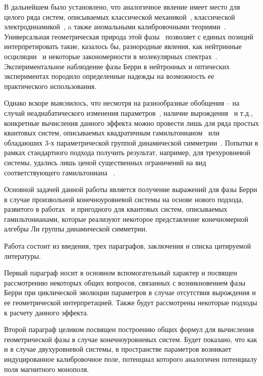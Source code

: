 \documentclass[a4paper,titlepage]{article}
\begin{document}
В дальнейшем было установлено, что аналогичное явление имеет место
для целого ряда систем, описываемых классической механикой~\cite{60},
классической электродинамикой~\cite{61}, a также аномальными калибровочными
теориями~\cite{62,63,64}. Универсальная геометрическая природа этой
фазы~\cite{SimonWork} позволяет с единых позиций интерпретировать такие, казалось бы,
разнородные явления, как нейтринные осциляции~\cite{NaumovWork} и некоторые
закономерности в молекулярных спектрах~\cite{AboutPhaseInSpectra}.
Экспериментальное наблюдение фазы Берри в нейтронных и оптических
экспериментах породило определенные надежды на возможность ее практического
использования.

Однако вскоре выяснилось, что несмотря на разнообразные обобщения -- на
случай неадиабатического изменения параметров~\cite{91}, наличие
вырождения~\cite{WilzekZeeWork} и т.д., конкретные вычисления данного эффекта
можно
провести лишь для ряда простых квантовых систем, описываемых квадратичным
гамильтонианом~\cite{About2Hamiltonian} или обладаюших 3-х параметрической
группой динамической симметрии~\cite{FirstBerryWork,AboutExactSolution}.
Попытки в рамках стандартного подхода
получить результат, например, для трехуровневой системы, удались лишь
ценой существенных ограничений на вид соответствующего
гамильтониана ~\cite{CeulemansWork,KorenblitWork}.

Основной задачей данной работы является получение выражений для
фазы Берри в случае произвольной конечноуровневой системы на основе нового
подхода, развитого в работах~\cite{TolkachevTregubovich1,TolkachevTregubovich2}
и пригодного для квантовых систем, описываемых гамильтонианами,
которые реализуют некоторое представление конечномерной алгебры Ли группы
динамической симметрии.

Работа состоит из введения, трех параграфов, заключения и списка цитируемой
литературы.

Первый параграф носит в основном вспомогательный характер и посвящен
рассмотрению некоторых общих вопросов, связанных с возникновением
фазы Берри при циклической эволюции параметров в случае отсутствия вырождения
и ее геометрической интерпретацией. Также будут рассмотрены некоторые подходы
к расчету данного эффекта.

Второй параграф целиком посвящен построению общих формул для вычисления
геометрической фазы в случае конечноуровневых систем. Будет показано, что как
 и в случае двухуровневой системы, в пространстве параметров возникает
индуцированное калибровочное поле, потенциал которого аналогичен потенциалу
поля магнитного монополя.
\end{document}
